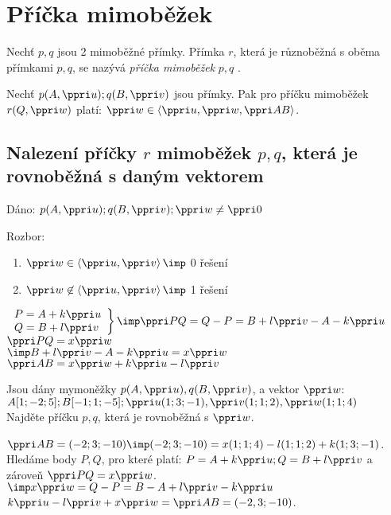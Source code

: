 
\section{ Příčka mimoběžek}
\Def Nechť $p, q$ jsou 2 mimoběžné přímky. Přímka $r$, která je různoběžná s oběma
přímkami $p, q$, se nazývá \emph{příčka mimoběžek} $p, q$ . 

\Poz Nechť $p(A,\ve u);q(B,\ve v)$ jsou přímky.
Pak pro příčku mimoběžek $r(Q,\ve w)$ platí:
$\ve w \in \<\ve u,\ve w,\ve{AB}\>$.

\subsection{Nalezení příčky $r$ mimoběžek $p, q$, která je rovnoběžná s daným vektorem}
\Poz Dáno: $p(A,\ve u);q(B,\ve v);\ve w \ne \ve 0$

Rozbor:
\begin{enumerate}[1)]
	\item $\ve w  \in \<\ve u , \ve v\> \imp$ 0 řešení
	\item $\ve w  \not\in \<\ve u , \ve v\> \imp$ 1 řešení
\end{enumerate}
$\left.\begin{array}{l} P = A + k \* \ve u\\ Q = B + l\* \ve v\end{array}\right\} \imp \ve{PQ} = Q - P = B + l \ve{v} - A - k\ve u$\\
	$\ve{PQ} = x \ve w $\\
	$\imp B + l \* \ve v - A - k \ve u = x \ve w$\\
	\underline{$\ve AB = x \ve w + k \ve u - l \ve v$}


	\Pr Jsou dány mymoněžky $p(A,\ve u),q(B,\ve v)$, a vektor $\ve w$:\\
	$A[1;-2;5]; B[-1;1;-5]; \ve u (1;3;-1), \ve v (1;1;2), \ve w (1;1;4)$\\
	Najděte příčku $p,q$, která je rovnoběžná s $\ve w$.

	$\ve{AB} = (-2;3;-10) \imp (-2;3;-10) = x (1;1;4) - l (1;1;2) + k (1;3;-1)$.
	Hledáme body $P,Q$, pro které platí:
	$P = A + k \* \ve u; Q = B + l\*\ve v$ a zároveň $\ve{PQ} = x \* \ve w$.\\
	$\imp x \*\ve w  = Q-P = B-A + l \ve v - k \ve u$\\
	$k\ve u-l\ve v + x \ve w=\ve {AB}= (-2,3;-10)$.

